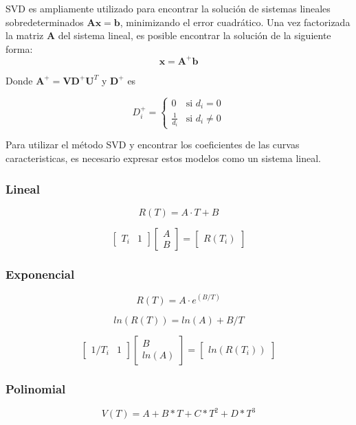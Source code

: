 \documentclass[conference]{IEEEtran}
\begin{document}
SVD es ampliamente utilizado para encontrar la solución de sistemas lineales sobredeterminados \( \mathbf{A}\mathbf{x} = \mathbf{b} \), minimizando el error cuadrático.
Una vez factorizada la matriz $\mathbf{A}$ del sistema lineal, es posible encontrar la soluci\'on de la siguiente forma:
\[
\mathbf{x} = \mathbf{A}^+ \mathbf{b}
\]


Donde $\mathbf{A}^{+} = \mathbf{V}\mathbf{D}^+ \mathbf{U}^T$ y $\mathbf{D}^+$ es 

\[
D_i^+ = 
\begin{cases}
	0 & \text{si } d_i = 0 \\
	\frac{1}{d_i} & \text{si } d_i \ne 0
\end{cases}
\]

Para utilizar el m\'etodo SVD y encontrar los coeficientes de las curvas caracteristicas, es necesario expresar estos modelos como un sistema lineal.


\subsubsection{Lineal}

\[
	R(T) = A \cdot T + B
\]

\[
	\begin{bmatrix} 
		T_{i} & 1 
	\end{bmatrix}
	\begin{bmatrix} 
		A \\ 
		B
	\end{bmatrix}
	= 
	\begin{bmatrix} 
		R(T_{i})
	\end{bmatrix}
\]


\subsubsection{Exponencial}
\[
	R(T) = A \cdot e^{(B/T)}
\]

\[
	ln(R(T)) = ln(A) + B/T
\]

\[
	\begin{bmatrix} 
		1/T_i & 1
	\end{bmatrix}
	\begin{bmatrix} 
		B \\
		ln(A)
	\end{bmatrix}
	=
	\begin{bmatrix} 
		ln(R(T_i))
	\end{bmatrix}
\]

\subsubsection{Polinomial}
\[
	V(T) = A + B * T + C * T^2 + D * T^3
\]
\end{document}
